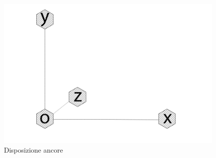 \begin{figure}[h]
	\centering
	\includegraphics[height=0.2\textheight]{uwb_axis.png}
	\caption{Disposizione ancore}
	\label{fig: disposizione ancore}
\end{figure}


